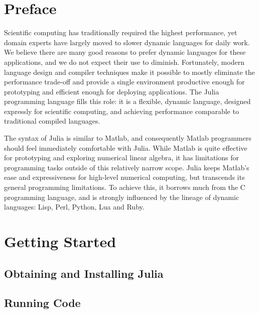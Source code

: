 \documentclass{article}
\title{\thetitle}
\author{
Jeff Bezanson \vspace{0.5em}\\
Stefan Karpinski \vspace{0.5em}\\
Viral Shah \vspace{0.5em}\\
Alan Edelman \vspace{0.5em}
}
\renewcommand{\sec}[1]{\label{sec:#1}}
\begin{document}
\maketitle

\clearpage

\section*{Preface}

Scientific computing has traditionally required the highest
performance, yet domain experts have largely moved to slower dynamic
languages for daily work.  We believe there are many good reasons to
prefer dynamic languages for these applications, and we do not expect
their use to diminish.  Fortunately, modern language design and
compiler techniques make it possible to mostly eliminate the
performance trade-off and provide a single environment productive
enough for prototyping and efficient enough for deploying
applications.  The Julia programming language fills this role: it is a
flexible, dynamic language, designed expressly for scientific
computing, and achieving performance comparable to traditional
compiled languages.

The syntax of Julia is similar to Matlab, and consequently Matlab
programmers should feel immediately comfortable with Julia.  While
Matlab is quite effective for prototyping and exploring numerical
linear algebra, it has limitations for programming tasks outside of
this relatively narrow scope.  Julia keeps Matlab's ease and
expressiveness for high-level numerical computing, but transcends its
general programming limitations.  To achieve this, it borrows much
from the C programming language, and is strongly influenced by the
lineage of dynamic languages: Lisp, Perl, Python, Lua and Ruby.

\clearpage

\tableofcontents

\clearpage

\section{Getting Started}\sec{getting-started}

\subsection{Obtaining and Installing Julia}\sec{obtaining-and-installing}

\subsection{Running Code}\sec{running-code}
\end{document}
